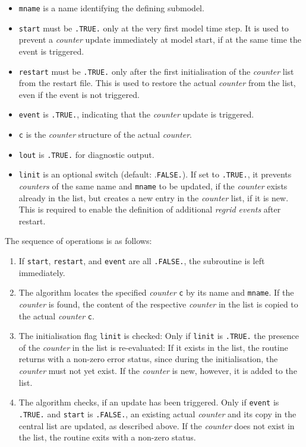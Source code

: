 \documentclass[11pt,twoside]{report}
\begin{document}
\begin{itemize}
\item \verb|mname| is a name identifying the defining submodel.
\item \verb|start| must be \verb|.TRUE.| only at the very first model
    time step. It is used to prevent a {\it counter} 
update immediately at model start, if at the same time the event is triggered.
\item \verb|restart| must be \verb|.TRUE.| only after the first
initialisation of the {\it counter} list from the restart file. 
This is used to restore the actual {\it counter} from the list,
even if the event is not triggered.
\item \verb|event| is \verb|.TRUE.|, indicating that the {\it counter} update is triggered.
\item \verb|c| is the {\it counter} structure of the actual {\it counter}.
\item \verb|lout| is \verb|.TRUE.| for diagnostic output.
\item \verb|linit| is an optional switch (default: .\verb|FALSE.|). 
If set to \verb|.TRUE.|, it prevents {\it counters} of the same name and 
\verb|mname| to be updated, if the {\it counter} exists already in the
list, but creates a new entry in the {\it counter} list, if it is
new. This is required to enable the definition of additional {\it
regrid events} after restart.
\end{itemize}
The sequence of operations is as follows:
\begin{enumerate}
\item If \verb|start|, \verb|restart|, and \verb|event| are all 
\verb|.FALSE.|, the subroutine is left immediately.
\item The algorithm locates the specified {\it counter} \verb|c| by
its name and \verb|mname|.
If the {\it counter} is found, the content of the respective {\it
counter} in the list is copied to the actual {\it counter} \verb|c|.
\item The initialisation flag \verb|linit| is checked: Only if \verb|linit|
 is \verb|.TRUE.| the presence of the {\it counter} in the list is
 re-evaluated:  
If it exists in the list, the routine returns with a non-zero error
 status, since during the initialisation, the {\it counter} must not yet
exist. If the {\it counter} is new, however, it is added to the list.
\item The algorithm checks, if an update has been triggered. Only if 
\verb|event| is \verb|.TRUE.| and \verb|start| is \verb|.FALSE.|,
 an existing actual {\it counter} and its copy in the
central list are updated, as described above. If the {\it counter}
does not exist in the list, the routine exits with a non-zero status.
\end{enumerate}
\end{document}
